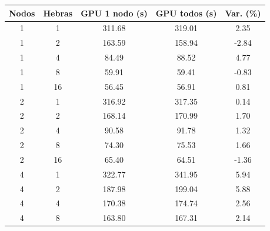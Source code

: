 \begin{table}[ht]
    \centering
    \scriptsize
    \setlength{\tabcolsep}{2pt}
    \renewcommand{\arraystretch}{1.1}
    \begin{tabular}{|c|c|c|c|c|}
        \hline
        \textbf{Nodos} & \textbf{Hebras} & \textbf{GPU 1 nodo (s)} & \textbf{GPU todos (s)} & \textbf{Var. (\%)} \\
        \hline
        1              & 1               & 311.68                  & 319.01                 & 2.35               \\
        1              & 2               & 163.59                  & 158.94                 & -2.84              \\
        1              & 4               & 84.49                   & 88.52                  & 4.77               \\
        1              & 8               & 59.91                   & 59.41                  & -0.83              \\
        1              & 16              & 56.45                   & 56.91                  & 0.81               \\
        2              & 1               & 316.92                  & 317.35                 & 0.14               \\
        2              & 2               & 168.14                  & 170.99                 & 1.70               \\
        2              & 4               & 90.58                   & 91.78                  & 1.32               \\
        2              & 8               & 74.30                   & 75.53                  & 1.66               \\
        2              & 16              & 65.40                   & 64.51                  & -1.36              \\
        4              & 1               & 322.77                  & 341.95                 & 5.94               \\
        4              & 2               & 187.98                  & 199.04                 & 5.88               \\
        4              & 4               & 170.38                  & 174.74                 & 2.56               \\
        4              & 8               & 163.80                  & 167.31                 & 2.14               \\

\end{tabular}
\end{table}
